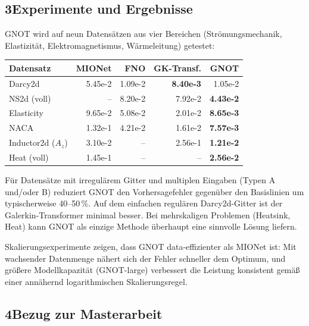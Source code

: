 \documentclass[a4paper,12pt]{article}
\begin{document}
\subsection*{3\quad Experimente und Ergebnisse}

GNOT wird auf neun Datensätzen aus vier Bereichen (Strömungsmechanik, Elastizität,
Elektromagnetismus, Wärmeleitung) getestet:

\begin{center}
\begin{tabular}{lrrrr}
\toprule
\textbf{Datensatz} & \textbf{MIONet} & \textbf{FNO} & \textbf{GK-Transf.} & \textbf{GNOT} \\
\midrule
Darcy2d & 5.45e-2 & 1.09e-2 & \textbf{8.40e-3} & 1.05e-2 \\
NS2d (voll) & -- & 8.20e-2 & 7.92e-2 & \textbf{4.43e-2} \\
Elasticity & 9.65e-2 & 5.08e-2 & 2.01e-2 & \textbf{8.65e-3} \\
NACA & 1.32e-1 & 4.21e-2 & 1.61e-2 & \textbf{7.57e-3} \\
Inductor2d ($A_z$) & 3.10e-2 & -- & 2.56e-1 & \textbf{1.21e-2} \\
Heat (voll) & 1.45e-1 & -- & -- & \textbf{2.56e-2} \\
\bottomrule
\end{tabular}
\end{center}

Für Datensätze mit irregulärem Gitter und multiplen Eingaben (Typen A und/oder B)
reduziert GNOT den Vorhersagefehler gegenüber den Basislinien um typischerweise
40--50\,\%. Auf dem einfachen regulären Darcy2d-Gitter ist der Galerkin-Transformer
minimal besser. Bei mehrskaligen Problemen (Heatsink, Heat) kann GNOT als einzige
Methode überhaupt eine sinnvolle Lösung liefern.

Skalierungsexperimente zeigen, dass GNOT data-effizienter als MIONet ist:
Mit wachsender Datenmenge nähert sich der Fehler schneller dem Optimum, und
größere Modellkapazität (GNOT-large) verbessert die Leistung konsistent gemäß
einer annähernd logarithmischen Skalierungsregel.

\subsection*{4\quad Bezug zur Masterarbeit}
\end{document}
